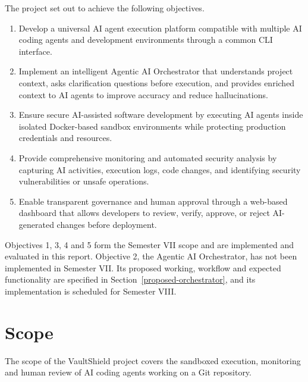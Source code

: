 \documentclass[12pt,a4paper,oneside]{report}
\providecommand{\tightlist}{\setlength{\itemsep}{0pt}\setlength{\parskip}{0pt}}
\begin{document}
The project set out to achieve the following objectives.
\begin{enumerate}
\def\labelenumi{\arabic{enumi}.}
\tightlist
\item
  Develop a universal AI agent execution platform compatible with multiple AI coding agents and development environments through a common CLI interface.
\item
  Implement an intelligent Agentic AI Orchestrator that understands project context, asks clarification questions before execution, and provides enriched context to AI agents to improve accuracy and reduce hallucinations.
\item
  Ensure secure AI-assisted software development by executing AI agents inside isolated Docker-based sandbox environments while protecting production credentials and resources.
\item
  Provide comprehensive monitoring and automated security analysis by capturing AI activities, execution logs, code changes, and identifying security vulnerabilities or unsafe operations.
\item
  Enable transparent governance and human approval through a web-based dashboard that allows developers to review, verify, approve, or reject AI-generated changes before deployment.
\end{enumerate}

Objectives 1, 3, 4 and 5 form the Semester VII scope and are implemented and evaluated in this report. Objective 2, the Agentic AI Orchestrator, has not been implemented in Semester VII. Its proposed working, workflow and expected functionality are specified in Section~\ref{proposed-orchestrator}, and its implementation is scheduled for Semester VIII.

\section{Scope}\label{scope}

The scope of the VaultShield project covers the sandboxed execution, monitoring and human review of AI coding agents working on a Git repository.
\end{document}
